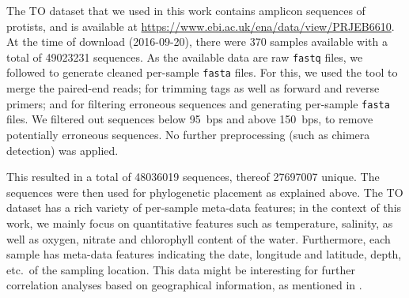 
The \acf{TO} dataset \cite{Karsenti2011,Sunagawa2015,Guidi2016}
that we used in this work contains amplicon sequences of protists,
and is available at \url{https://www.ebi.ac.uk/ena/data/view/PRJEB6610}.
At the time of download (2016-09-20), there were \num{370} samples available with a total of \num{49 023 231} sequences.
As the available data are raw \texttt{fastq} files,
we followed  to generate cleaned per-sample \texttt{fasta} files.
For this, we used the tool  \cite{Zhang2014} to merge the paired-end reads;
 \cite{Martin2011} for trimming tags as well as forward and reverse primers;
and  \cite{Rognes2016} for filtering erroneous sequences and
generating per-sample \texttt{fasta} files.
We filtered out sequences below \SI{95}{bps} and above \SI{150}{bps}, to remove potentially erroneous sequences.
No further preprocessing (such as chimera detection) was applied.

This resulted in a total of \num{48 036 019} sequences, thereof \num{27 697 007} unique.
The sequences were then used for phylogenetic placement as explained above.
The \ac{TO} dataset has a rich variety of per-sample meta-data features;
in the context of this work, we mainly focus on quantitative features such as
temperature, salinity, as well as oxygen, nitrate and chlorophyll content of the water.
Furthermore, each sample has meta-data features indicating the date, longitude and latitude, depth, etc.~of the sampling location.
This data might be interesting for further correlation analyses based on geographical information,
as mentioned in .

